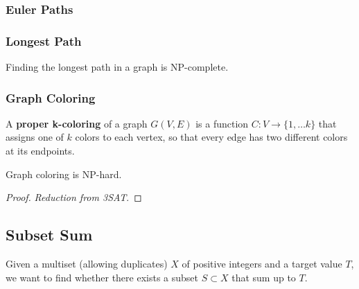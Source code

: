 \documentclass{article}
\begin{document}
    \subsubsection{Euler Paths}

    \subsubsection{Longest Path}

      \begin{theorem}
        Finding the longest path in a graph is NP-complete. 
      \end{theorem}

    \subsubsection{Graph Coloring} 

      \begin{definition}
        A \textbf{proper k-coloring} of a graph $G(V, E)$ is a function $C: V \rightarrow \{1, \ldots k\}$ that assigns one of $k$ colors to each vertex, so that every edge has two different colors at its endpoints. 
      \end{definition}

      \begin{theorem}
        Graph coloring is NP-hard. 
      \end{theorem}
      \begin{proof}
        \textit{Reduction from 3SAT}. 
      \end{proof}

  \subsection{Subset Sum}

    \begin{definition}
      Given a multiset (allowing duplicates) $X$ of positive integers and a target value $T$, we want to find whether there exists a subset $S \subset X$ that sum up to $T$. 
    \end{definition}
\end{document}
